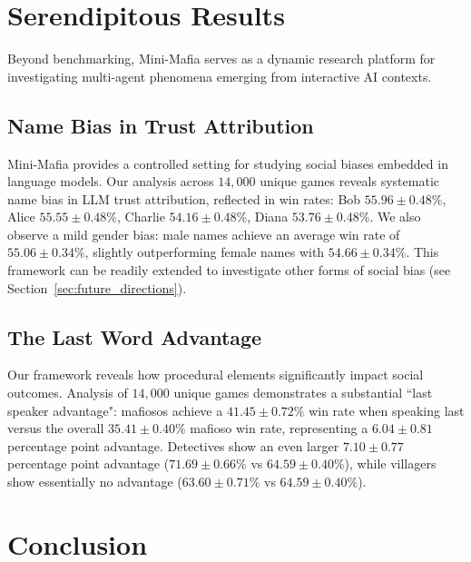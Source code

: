 \documentclass{article}
\begin{document}
\vspace{0.5\baselineskip}

\section{Serendipitous Results}
\label{sec:serendipitous_results}

Beyond benchmarking, Mini-Mafia serves as a dynamic research platform for investigating multi-agent phenomena emerging from interactive AI contexts.

\subsection{Name Bias in Trust Attribution}
\label{sec:name_bias_in_trust}

Mini-Mafia provides a controlled setting for studying social biases embedded in language models. Our analysis across $14{,}000$ unique games reveals systematic name bias in LLM trust attribution, reflected in win rates: Bob $55.96\pm 0.48\%$, Alice $55.55\pm 0.48\%$, Charlie $54.16\pm 0.48\%$, Diana $53.76\pm 0.48\%$. We also observe a mild gender bias: male names achieve an average win rate of $55.06 \pm 0.34\%$, slightly outperforming female names with $54.66 \pm 0.34\%$. This framework can be readily extended to investigate other forms of social bias (see Section~\ref{sec:future_directions}).



\subsection{The Last Word Advantage}
\label{sec:last_speaker_advantage}

Our framework reveals how procedural elements significantly impact social outcomes. Analysis of $14,000$ unique games demonstrates a substantial ``last speaker advantage": mafiosos achieve a $41.45 \pm 0.72\%$ win rate when speaking last versus the overall $35.41 \pm 0.40\%$ mafioso win rate, representing a $6.04 \pm 0.81$ percentage point advantage. Detectives show an even larger $7.10 \pm 0.77$ percentage point advantage ($71.69 \pm 0.66\%$ vs $64.59 \pm 0.40\%$), while villagers show essentially no advantage ($63.60 \pm 0.71\%$ vs $64.59 \pm 0.40\%$).


\section{Conclusion}
\end{document}
